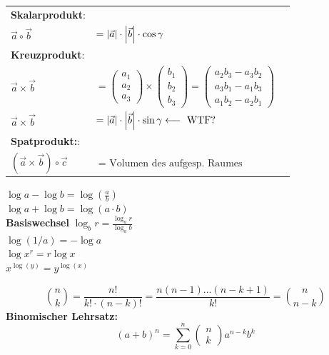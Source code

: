 \documentclass[a4paper]{article}
\begin{document}
\begin{appendix}
\begin{multicols}{2}
			\begin{fdef}
			\begin{center}
				\begin{tabular}{lll}
					\textbf{Skalarprodukt}: & \\
					$\vec{a}\circ\vec{b} $&$= \left|\vec{a}\right| \cdot \left|\vec{b}\right| \cdot \cos \gamma$ \\
					\textbf{Kreuzprodukt}: & \\
					$\vec{a}\times\vec{b}
					$&$=
					\begin{pmatrix}a_1 \\ a_2 \\ a_3\end{pmatrix}
					\times
					\begin{pmatrix}b_1 \\ b_2 \\ b_3 \end{pmatrix}
					=
					\begin{pmatrix}
						a_2b_3 - a_3b_2 \\
						a_3b_1 - a_1b_3 \\
						a_1b_2 - a_2b_1
					\end{pmatrix}$ \\
					$\vec{a} \times \vec{b} $&$= \left|\vec a\right| \cdot \left|\vec b\right| \cdot \sin \gamma \longleftarrow \text{ WTF? }$ \\
					\textbf{Spatprodukt:}: & \\
					$(\vec{a}\times\vec{b})\circ\vec{c} $&$= \text{ Volumen des aufgesp. Raumes}$
				\end{tabular}
				\end{center}
			\end{fdef}
			\begin{fregeln}
				\vspace{-4mm}
				\begin{multicols}{2}
					$\log a - \log b = \log (\frac{a}{b})$\\
					$\log a + \log b = \log (a \cdot b)$\\
					\small \textbf{Basiswechsel} \hspace{2mm} $\log_b r = \frac{\log_a r}{\log_a b}$
					\columnbreak \\
					$\log (1/a) = -\log a$ \\
					$\log x^r = r \log x$\\
					$x^{\log(y)}=y^{\log(x)}$
				\end{multicols}
				\vspace{-3mm}
			\end{fregeln}
			\begin{fdef}[Binomialkoeffizient]
				$${n \choose k} = \frac{n!}{k! \cdot (n-k)!} = \frac{n(n-1)...(n-k+1)}{k!} = {n\choose n-k}$$
				\textbf{Binomischer Lehrsatz:}
					$$(a+b)^n = \sum_{k=0}^n \left( \begin{array}{c}
													n\\
													k
													\end{array} \right) a^{n-k}b^k$$


\end{fdef}
\end{multicols}
\end{appendix}
\end{document}
